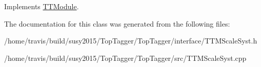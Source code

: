 Implements \hyperlink{classTTModule_a14e7c03fbf4ee1a5008c9344adc7c896}{T\-T\-Module}.



The documentation for this class was generated from the following files\-:\begin{DoxyCompactItemize}
\item 
/home/travis/build/susy2015/\-Top\-Tagger/\-Top\-Tagger/interface/T\-T\-M\-Scale\-Syst.\-h\item 
/home/travis/build/susy2015/\-Top\-Tagger/\-Top\-Tagger/src/T\-T\-M\-Scale\-Syst.\-cpp\end{DoxyCompactItemize}
